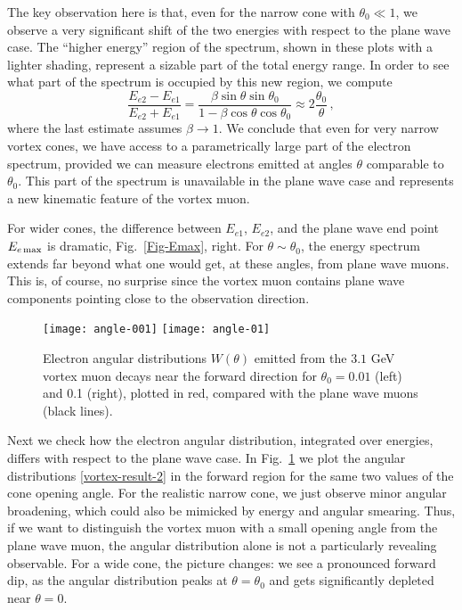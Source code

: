 \documentclass[aps,prd,longbibliography,nofootinbib,amsthm,amsmath,amssymb,amsfonts,notitlepage]{revtex4-1}
\begin{document}
The key observation here is that, even for the narrow cone with $\theta_0 \ll 1$,
we observe a very significant shift of the two energies with respect to the plane wave case.
The ``higher energy'' region of the spectrum, shown in these plots with a lighter shading,
represent a sizable part of the total energy range.
In order to see what part of the spectrum is occupied by this new region, we compute
\begin{equation}
\frac{E_{e2}-E_{e1}}{E_{e2}+E_{e1}} = \frac{\beta\sin\theta\sin\theta_0}{1-\beta\cos\theta\cos\theta_0} \approx 2\frac{\theta_0}{\theta}\,,
\end{equation}
where the last estimate assumes $\beta \to 1$.
We conclude that even for very narrow vortex cones, we have access to a parametrically large part of the
electron spectrum, provided we can measure electrons emitted at angles $\theta$ comparable to $\theta_0$.
This part of the spectrum is unavailable in the plane wave case and represents a new kinematic feature of the vortex muon.

For wider cones, the difference between $E_{e1}$, $E_{e2}$, and the plane wave end point $E_{e\,\rm max}$ is dramatic, Fig.~\ref{Fig-Emax}, right.
For $\theta \sim \theta_0$, the energy spectrum extends far beyond what one would get, at these angles, from plane wave muons.
This is, of course, no surprise since the vortex muon contains plane wave components pointing close to the observation direction.

\begin{figure}[!h]
	\centering
	\texttt{[image: angle-001]}\hfill
	\texttt{[image: angle-01]}
	\caption{Electron angular distributions $W(\theta)$ emitted from the $3.1$ GeV vortex muon decays near the forward direction
	for $\theta_0 = 0.01$ (left) and 0.1 (right), plotted in red, compared with the plane wave muons (black lines).}\label{Fig-angular}
\end{figure}

Next we check how the electron angular distribution, integrated over energies,
differs with respect to the plane wave case.
In Fig.~\ref{Fig-angular} we plot the angular distributions \eqref{vortex-result-2}
in the forward region for the same two values of the cone opening angle.
For the realistic narrow cone, we just observe minor angular broadening,
which could also be mimicked by energy and angular smearing.
Thus, if we want to distinguish the vortex muon with a small opening angle from the plane wave muon,
the angular distribution alone is not a particularly revealing observable.
For a wide cone, the picture changes: we see a pronounced forward dip, as the angular distribution
peaks at $\theta = \theta_0$ and gets significantly depleted near $\theta = 0$.
\end{document}
